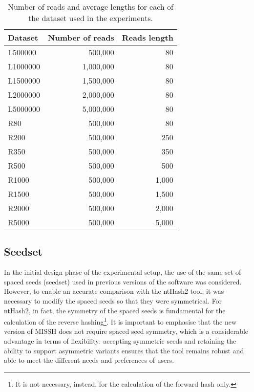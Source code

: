 	\begin{table}[ht!]
		\centering
		\begin{tabular}{l r r}
			\textbf{Dataset} & \textbf{Number of reads} & \textbf{Reads length} \\
			\toprule
			L500000 & 500,000 & 80 \\
			L1000000 & 1,000,000 & 80 \\
			L1500000 & 1,500,000 & 80 \\
			L2000000 & 2,000,000 & 80 \\
			L5000000 & 5,000,000 & 80 \\
			\midrule
			R80 & 500,000 & 80 \\
			R200 & 500,000 & 250 \\
			R350 & 500,000 & 350 \\
			R500 & 500,000 & 500 \\
			R1000 & 500,000 & 1,000 \\
			R1500 & 500,000 & 1,500 \\
			R2000 & 500,000 & 2,000 \\
			R5000 & 500,000 & 5,000 \\
			\bottomrule
		\end{tabular}
		\caption{Number of reads and average lengths for each of the dataset used in the experiments.}
		\label{tab:dataset}
	\end{table}




	\subsection{Seedset}
	\label{subsec:seedset}
	
	In the initial design phase of the experimental setup, the use of the same set of spaced seeds (seedset) used in previous versions of the software was considered. However, to enable an accurate comparison with the ntHash2 tool, it was necessary to modify the spaced seeds so that they were symmetrical. For ntHash2, in fact, the symmetry of the spaced seeds is fundamental for the calculation of the reverse hashing\footnote{It is not necessary, instead, for the calculation of the forward hash only.}. It is important to emphasise that the new version of \acs{MISSH} does not require spaced seed symmetry, which is a considerable advantage in terms of flexibility: accepting symmetric seeds and retaining the ability to support asymmetric variants ensures that the tool remains robust and able to meet the different needs and preferences of users.
	
